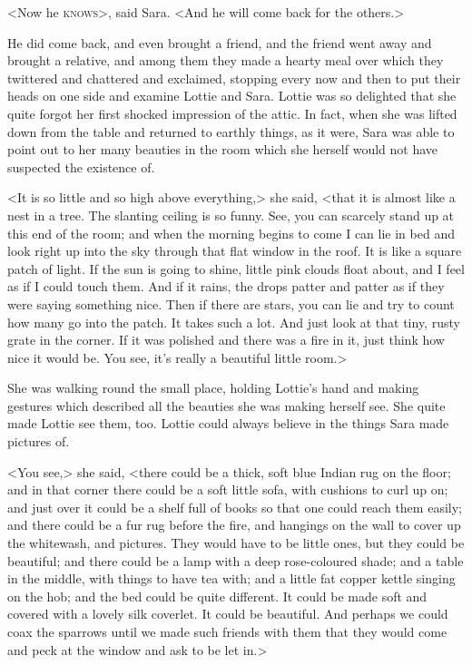 <Now he \textsc{knows}>, said Sara. <And he will come back for the others.>

He did come back, and even brought a friend, and the friend went away and brought a relative, and among them they made a hearty meal over which they twittered and chattered and exclaimed, stopping every now and then to put their heads on one side and examine Lottie and Sara. Lottie was so delighted that she quite forgot her first shocked impression of the attic. In fact, when she was lifted down from the table and returned to earthly things, as it were, Sara was able to point out to her many beauties in the room which she herself would not have suspected the existence of.

<It is so little and so high above everything,> she said, <that it is almost like a nest in a tree. The slanting ceiling is so funny. See, you can scarcely stand up at this end of the room; and when the morning begins to come I can lie in bed and look right up into the sky through that flat window in the roof. It is like a square patch of light. If the sun is going to shine, little pink clouds float about, and I feel as if I could touch them. And if it rains, the drops patter and patter as if they were saying something nice. Then if there are stars, you can lie and try to count how many go into the patch. It takes such a lot. And just look at that tiny, rusty grate in the corner. If it was polished and there was a fire in it, just think how nice it would be. You see, it's really a beautiful little room.>

She was walking round the small place, holding Lottie's hand and making gestures which described all the beauties she was making herself see. She quite made Lottie see them, too. Lottie could always believe in the things Sara made pictures of.

<You see,> she said, <there could be a thick, soft blue Indian rug on the floor; and in that corner there could be a soft little sofa, with cushions to curl up on; and just over it could be a shelf full of books so that one could reach them easily; and there could be a fur rug before the fire, and hangings on the wall to cover up the whitewash, and pictures. They would have to be little ones, but they could be beautiful; and there could be a lamp with a deep rose-coloured shade; and a table in the middle, with things to have tea with; and a little fat copper kettle singing on the hob; and the bed could be quite different. It could be made soft and covered with a lovely silk coverlet. It could be beautiful. And perhaps we could coax the sparrows until we made such friends with them that they would come and peck at the window and ask to be let in.>

